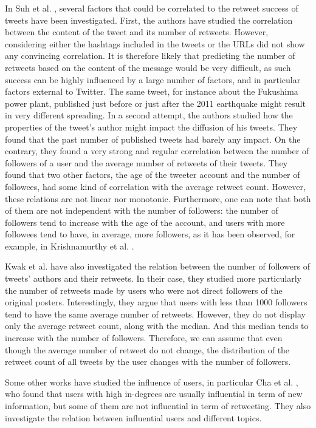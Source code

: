 \documentclass[conference]{IEEEtran}
\begin{document}
In Suh et al. \cite{suh2010want}, several factors that could be correlated to the retweet success of tweets have been investigated. First, the authors have studied the correlation between the content of the tweet and its number of retweets. However, considering either the hashtags included in the tweets or the URLs did not show any convincing correlation. It is therefore likely that predicting the number of retweets  based on the content of the message would be very difficult, as such success can be highly influenced by a large number of factors, and in particular factors external to Twitter. The same tweet, for instance about the Fukushima power plant, published just before or just after the 2011 earthquake might result in very different spreading. In a second attempt, the authors studied how the properties of the tweet's author might impact the diffusion of his tweets. They found that the past number of published tweets had barely any impact.
On the contrary, they found a very strong and regular correlation between the number of followers of a user and the average number of retweets of their tweets.
They found that two other factors, the age of the tweeter account and the number of followees, had some kind of correlation with the average retweet count. However, these relations are not linear nor monotonic. Furthermore, one can note that both of them are not independent with the number of followers: the number of followers tend to increase with the age of the account, and users with more followees tend to have, in average, more followers, as it has been observed, for example, in Krishnamurthy et al. \cite{krishnamurthy2008few}.


Kwak et al. \cite{kwak2010twitter} have also investigated the relation between the number of followers of tweets' authors and their retweets. In their case, they studied more particularly the number of retweets made by users who were not direct followers of the original posters. Interestingly, they argue that users with less than 1000 followers tend to have the same average number of retweets. However, they do not display only the average retweet count, along with the median. And this median tends to increase with the number of followers. Therefore, we can assume that even though the average number of retweet do not change, the distribution of the retweet count of all tweets by the user changes with the number of followers.

Some other works have studied the influence of users, in particular Cha et al. \cite{cha2010measuring}, who found that users with high in-degrees are usually influential in term of new information, but some of them are not influential in term of retweeting. They also investigate the relation between influential users and different topics.
\end{document}
